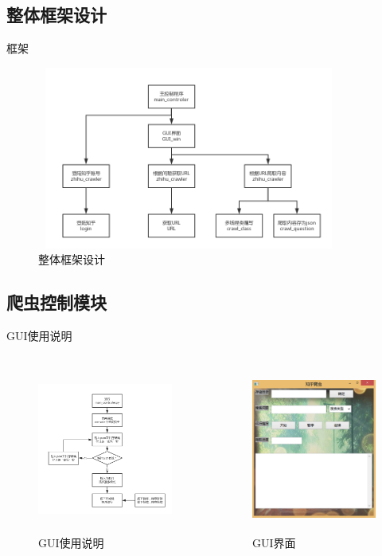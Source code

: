 \documentclass[aspectratio=169]{beamer}
\begin{document}
\subsection{整体框架设计}
\begin{frame}{框架}
\begin{figure}
  \centering
  \includegraphics[width=10cm,height=6cm]{模块关系}
  \caption{整体框架设计}
\end{figure}
\end{frame}

\subsection{爬虫控制模块}
\begin{frame}{GUI使用说明}
\begin{columns}
\column{8cm}
\begin{figure}
  \centering
  \includegraphics[width=6.5cm,height=5.5cm]{GUI使用说明}
  \caption{GUI使用说明}
\end{figure}

\column{7cm}
\begin{figure}
  \centering
  \includegraphics[width=6cm,height=5.5cm]{GUI界面}
  \caption{GUI界面}
\end{figure}
\end{columns}
\end{frame}
\end{document}
